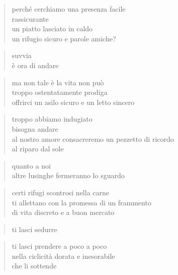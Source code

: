 \begin{poem}
\begin{poem}
	\begin{verse}
                perché cerchiamo una presenza facile\\
                rassicurante\\
                un piatto lasciato in caldo\\
                un rifugio sicuro e parole amiche?
	\end{verse}

	\begin{verse}
                suvvia\\
                è ora di andare
	\end{verse}

	\begin{verse}
                ma non tale è la vita non può\\
                troppo ostentatamente prodiga\\
                offrirci un asilo sicuro e un letto sincero
	\end{verse}

	\begin{verse}
                troppo abbiamo indugiato\\
                bisogna andare\\
                al nostro amore consacreremo un pezzetto di ricordo\\
                al riparo dal sole
	\end{verse}

	\begin{verse}
                quanto a noi\\
                altre lusinghe fermeranno lo sguardo
	\end{verse}

\clearpage


	\begin{verse}
                certi rifugi scontrosi nella carne\\
                ti allettano con la promessa di un frammento\\
                di vita discreto e a buon mercato
	\end{verse}

	\begin{verse}
                ti lasci sedurre
	\end{verse}

	\begin{verse}
                ti lasci prendere a poco a poco\\
                nella ciclicità dorata e inesorabile\\
                che li sottende
	\end{verse}


\end{poem}
\end{poem}
